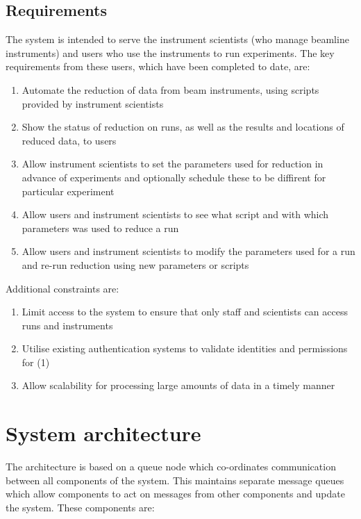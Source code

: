 \documentclass[twocolumn]{article}
\begin{document}
\subsection{Requirements}\label{requirements}

The system is intended to serve the instrument scientists (who manage beamline instruments) 
and users who use the instruments to run experiments. 
The key requirements from these users, which have been completed to date, are:

\begin{enumerate}[noitemsep]
\item
  Automate the reduction of data from beam instruments, using scripts
  provided by instrument scientists
\item
  Show the status of reduction on runs, as well as the results and
  locations of reduced data, to users
\item
  Allow instrument scientists to set the parameters used for reduction
  in advance of experiments and optionally schedule these to be diffirent
  for particular experiment
\item
  Allow users and instrument scientists to see what script and with which
  parameters was used to reduce a run
\item
  Allow users and instrument scientists to modify the parameters used
  for a run and re-run reduction using new parameters or scripts
\end{enumerate}

Additional constraints are:

\begin{enumerate}[noitemsep]
\item
  Limit access to the system to ensure that only staff and scientists
  can access runs and instruments
\item
  Utilise existing authentication systems to validate identities and
  permissions for (1)
\item
  Allow scalability for processing large amounts of data in a timely
  manner
\end{enumerate}

\section{System architecture}\label{system-architecture}

The architecture is based on a queue node which co-ordinates
communication between all components of the system. This maintains
separate message queues which allow components to act on messages from
other components and update the system. These components are:
\end{document}
